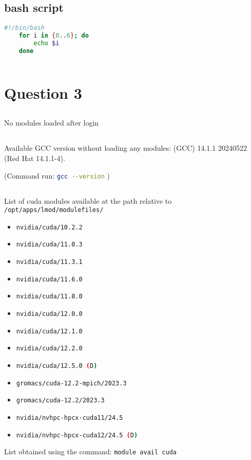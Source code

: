 \documentclass[12pt]{article}
\begin{document}
\subsection{bash script}
\begin{lstlisting}[language=bash]
    #!/bin/bash
    for i in {0..6}; do
        echo $i
    done
    
\end{lstlisting}

\section{Question 3}
\subsection{}
No modules loaded after login

\subsection{}
Available GCC version without loading any modules: (GCC) 14.1.1 20240522 (Red Hat 14.1.1-4).

(Command run: \lstinline[language=bash]|gcc --version| )

\pagebreak
\subsection{}
List of cuda modules available at the path relative to \lstinline[language=bash]|/opt/apps/lmod/modulefiles/|
\begin{itemize}
    \item \lstinline[language=bash]|nvidia/cuda/10.2.2|
    \item \lstinline[language=bash]|nvidia/cuda/11.0.3|
    \item \lstinline[language=bash]|nvidia/cuda/11.3.1|
    \item \lstinline[language=bash]|nvidia/cuda/11.6.0|
    \item \lstinline[language=bash]|nvidia/cuda/11.8.0|
    \item \lstinline[language=bash]|nvidia/cuda/12.0.0|
    \item \lstinline[language=bash]|nvidia/cuda/12.1.0|
    \item \lstinline[language=bash]|nvidia/cuda/12.2.0|
    \item \lstinline[language=bash]|nvidia/cuda/12.5.0 (D)|
    \item \lstinline[language=bash]|gromacs/cuda-12.2-mpich/2023.3|
    \item \lstinline[language=bash]|gromacs/cuda-12.2/2023.3|
    \item \lstinline[language=bash]|nvidia/nvhpc-hpcx-cuda11/24.5|
    \item \lstinline[language=bash]|nvidia/nvhpc-hpcx-cuda12/24.5 (D)|
\end{itemize}
List obtained using the command: \lstinline[language=bash]|module avail cuda|
\end{document}
